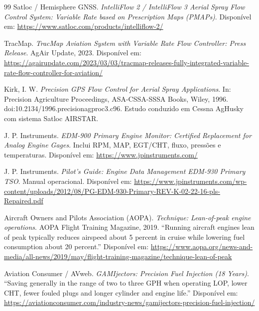 \documentclass[a4paper,12pt]{article}
\begin{document}
\begin{thebibliography}{99}
    Satloc / Hemisphere GNSS. \textit{IntelliFlow 2 / IntelliFlow 3 Aerial Spray Flow Control System: Variable Rate based on Prescription Maps (PMAPs)}. Disponível em: \url{https://www.satloc.com/products/intelliflow-2/}

    TracMap. \textit{TracMap Aviation System with Variable Rate Flow Controller: Press Release}. AgAir Update, 2023. Disponível em: \url{https://agairupdate.com/2023/03/03/tracmap-releases-fully-integrated-variable-rate-flow-controller-for-aviation/}

    Kirk, I. W. \textit{Precision GPS Flow Control for Aerial Spray Applications}. In: Precision Agriculture Proceedings, ASA-CSSA-SSSA Books, Wiley, 1996. doi:10.2134/1996.precisionagproc3.c96. Estudo conduzido em Cessna AgHusky com sistema Satloc AIRSTAR.

    J. P. Instruments. \textit{EDM-900 Primary Engine Monitor: Certified Replacement for Analog Engine Gages}. Inclui RPM, MAP, EGT/CHT, fluxo, pressões e temperaturas. Disponível em: \url{https://www.jpinstruments.com/}

    J. P. Instruments. \textit{Pilot's Guide: Engine Data Management EDM-930 Primary TSO}. Manual operacional. Disponível em: \url{https://www.jpinstruments.com/wp-content/uploads/2012/08/PG-EDM-930-Primary-REV-K-02-22-16-pls-Repaired.pdf}

    Aircraft Owners and Pilots Association (AOPA). \textit{Technique: Lean-of-peak engine operations}. AOPA Flight Training Magazine, 2019. ``Running aircraft engines lean of peak typically reduces airspeed about 5 percent in cruise while lowering fuel consumption about 20 percent.'' Disponível em: \url{https://www.aopa.org/news-and-media/all-news/2019/may/flight-training-magazine/technique-lean-of-peak}

    Aviation Consumer / AVweb. \textit{GAMIjectors: Precision Fuel Injection (18 Years)}. ``Saving generally in the range of two to three GPH when operating LOP, lower CHT, fewer fouled plugs and longer cylinder and engine life.'' Disponível em: \url{https://aviationconsumer.com/industry-news/gamijectors-precision-fuel-injection/}

\end{thebibliography}
\end{document}
